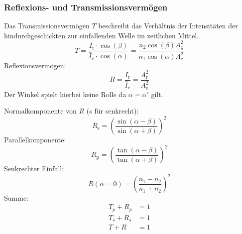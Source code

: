 \documentclass[a4paper, 11pt, ngerman, parskip=half-]{scrartcl}
\begin{document}
\subsubsection*{Reflexions- und Transmissionsvermögen}
Das Transmissionsvermögen $T$ beschreibt das Verhältnis der Intensitäten der hindurchgeschickten zur einfallenden Welle im zeitlichen Mittel.
%
\begin{equation}
    \label{eq:transmissionsvermoegen}
    T = \frac{\bar{I}_{\text{t}} \cdot \cos (\beta)}{\bar{I}_{\text{e}}\cdot \cos (\alpha)} = \frac{n_2 \cos (\beta) A_{\text{g}}^2}{n_1 \cos (\alpha) A_{\text{e}}^2}
\end{equation}
%
Reflexionsvermögen:
%
\begin{equation}
    \label{eq:reflexionsvermoegen}
    R = \frac{\bar{I}_{\text{r}}}{\bar{I}_{\text{e}}} = \frac{A_{\text{r}}^2}{A_{\text{e}}^2}
\end{equation}
%
Der Winkel spielt hierbei keine Rolle da $\alpha = \alpha'$ gilt.

Normalkomponente von $R$ (s für senkrecht):
%
\begin{equation}
    \label{eq:reflexionsvermoegen_senkrecht}
    R_{\text{s}} = \left( \frac{\sin(\alpha - \beta)}{\sin(\alpha + \beta)} \right)^2
\end{equation}
%
Parallelkomponente:
%
\begin{equation}
    \label{eq:reflexionsvermoegen_parallel}
    R_{\text{p}} = \left( \frac{\tan(\alpha - \beta)}{\tan(\alpha + \beta)} \right)^2
\end{equation}
%
Senkrechter Einfall:
%
\begin{equation}
    \label{eq:reflexionsvermoegen_senkrechter_einfall}
    R(\alpha = 0) = \left( \frac{n_1 - n_2}{n_1 + n_2} \right)^2
\end{equation}
%
Summe:
%
\begin{equation}
    \label{eq:summe_reflexion_transmission}
    \begin{split}
        T_p + R_p &= 1 \\
        T_s + R_s &= 1 \\
        T + R     &= 1
    \end{split}
\end{equation}
\end{document}
